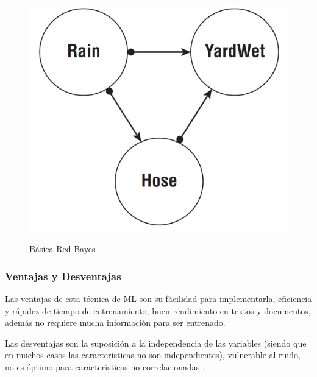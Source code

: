 \begin{figure}[H]
	\centering
	\includegraphics[scale=0.3]{img/Marco Teorico/Redes Bayes.png}  
	\label{fig:Red Bayes}
	\caption{Básica Red Bayes}
\end{figure}

\doublespacing
\subsubsection{Ventajas y Desventajas}
Las ventajas de esta técnica de ML son su fácilidad para implementarla, eficiencia y rápidez de tiempo de entrenamiento, buen rendimiento en textos y documentos, además no requiere mucha información para ser entrenado.\\
\par Las desventajas son la suposición a la independencia de las variables (siendo que en muchos casos las características no son independientes), vulnerable al ruido, no es óptimo para características no correlacionadas \cite{Bell15}.

\doublespacing
